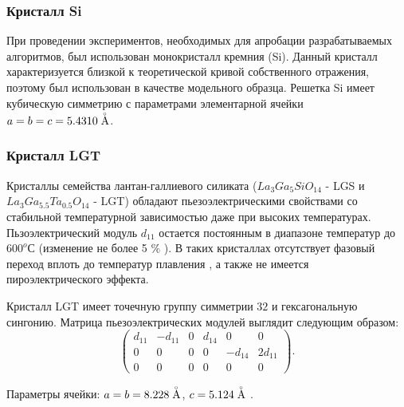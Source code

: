   \label{sec:piezo_matrix}

  \subsubsection*{ Кристалл Si }
  При проведении экспериментов, необходимых для апробации разрабатываемых алгоритмов,
  был использован монокристалл кремния (Si). Данный
  кристалл характеризуется близкой к теоретической кривой собственного отражения, поэтому
  был использован в качестве модельного образца. Решетка Si имеет кубическую симметрию
  с параметрами элементарной ячейки  $a = b = c = 5.4310 \angstrom$.

  \subsubsection*{ Кристалл LGT }
  Кристаллы семейства лантан-галлиевого силиката ($La_3Ga_5SiO_{14}$ - LGS и $La_3Ga_{5.5}Ta_{0.5}O_{14}$ - LGT)
  обладают пьезоэлектрическими свойствами со стабильной температурной зависимостью
  даже при высоких температурах. Пьзоэлектрический модуль $d_{11}$ остается
  постоянным в диапазоне температур до $600^o$С (изменение не более 5 $\%$ \cite{LGS58}).
  В таких кристаллах отсутствует фазовый переход вплоть до температур плавления \cite{LGS57},
   а также не имеется пироэлектрического эффекта.

  Кристалл LGT имеет точечную группу симметрии $32$ и гексагональную сингонию.
  Матрица пьезоэлектрических модулей выглядит следующим образом:
  \begin{equation}
    \begin{pmatrix}
    d_{11} & -d_{11} & 0 & d_{14} & 0 & 0 \\
    0 & 0 & 0 & 0 & -d_{14} & 2d_{11} \\
    0 & 0 & 0 & 0 & 0 & 0
    \end{pmatrix}.
    \label{eq:piezomodule_lgt_matrica}
  \end{equation}
  
  Параметры ячейки: $a = b = 8.228 \angstrom$, $c = 5.124 \angstrom$ \cite{marchenkov2014}.
